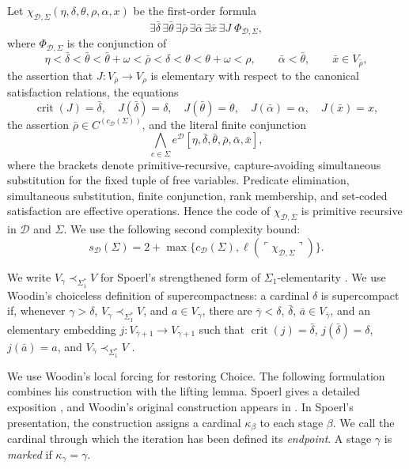 \documentclass[11pt,a4paper]{amsart}
\newif\ifrevisionblue
\DeclareRobustCommand{\revision}[1]{{\ifrevisionblue\color{blue}\fi#1}}
\newcommand{\crit}{\operatorname{crit}}
\theoremstyle{plain}
\theoremstyle{definition}
\theoremstyle{remark}
\begin{document}
Let $\chi_{\mathcal D,\Sigma}(\eta,\delta,\theta,\rho,\alpha,x)$ be the first-order formula
\[
\exists\bar\delta\,\exists\bar\theta\,\exists\bar\rho\,
\exists\bar\alpha\,\exists\bar x\,\exists J\;\Phi_{\mathcal D,\Sigma},
\]
where $\Phi_{\mathcal D,\Sigma}$ is the conjunction of
\[
\eta<\bar\delta<\bar\theta<\bar\theta+\omega<\bar\rho<
\delta<\theta<\theta+\omega<\rho,\qquad
\bar\alpha<\bar\theta,\qquad \bar x\in V_{\bar\rho},
\]
the assertion that $J:V_{\bar\rho}\to V_\rho$ is elementary with respect to the canonical satisfaction relations, the equations
\[
\crit(J)=\bar\delta,\quad J(\bar\delta)=\delta,\quad
J(\bar\theta)=\theta,\quad J(\bar\alpha)=\alpha,\quad J(\bar x)=x,
\]
the assertion $\bar\rho\in C^{(c_{\mathcal D}(\Sigma))}$, and the literal finite conjunction
\[
\bigwedge_{e\in\Sigma}
e^{\mathcal D}
[\eta,\bar\delta,\bar\theta,\bar\rho,\bar\alpha,\bar x],
\]
where the brackets denote primitive-recursive, capture-avoiding simultaneous substitution for the fixed tuple of free variables.  Predicate elimination, simultaneous substitution, finite conjunction, rank membership, and set-coded satisfaction are effective operations.  Hence the code of $\chi_{\mathcal D,\Sigma}$ is primitive recursive in $\mathcal D$ and $\Sigma$.  We use the following second complexity bound:
\[
s_{\mathcal D}(\Sigma)=2+\max\bigl\{c_{\mathcal D}(\Sigma),
\ell(\ulcorner\chi_{\mathcal D,\Sigma}\urcorner)\bigr\}.
\]
\endgroup

We write $V_\gamma\prec_{\Sigma_1^*}V$ for Spoerl's strengthened form of $\Sigma_1$-elementarity \cite[Definition~20]{Spoerl}.  We use Woodin's choiceless definition of supercompactness: a cardinal $\delta$ is supercompact if, whenever $\gamma>\delta$, $V_\gamma\prec_{\Sigma_1^*}V$, and $a\in V_\gamma$, there are $\bar\gamma<\delta$, $\bar\delta$, $\bar a\in V_{\bar\gamma}$, and an elementary embedding $j:V_{\bar\gamma+1}\to V_{\gamma+1}$ such that $\crit(j)=\bar\delta$, $j(\bar\delta)=\delta$, $j(\bar a)=a$, and $V_{\bar\gamma}\prec_{\Sigma_1^*}V$ \cite[Definition~21]{Spoerl}.

We use Woodin's local forcing for restoring Choice.  The following formulation combines his construction with the lifting lemma.  Spoerl gives a detailed exposition {\cite[Definition~43, \revision{Theorem~44}, and Lemma~45]{Spoerl}}, and Woodin's original construction appears in \cite[pp.~323--324]{Woodin}.  In Spoerl's presentation, the construction assigns a cardinal $\kappa_\beta$ to each stage $\beta$.  We call the cardinal through which the iteration has been defined its \emph{endpoint}.  A stage $\gamma$ is \emph{marked} if $\kappa_\gamma=\gamma$.
\end{document}
